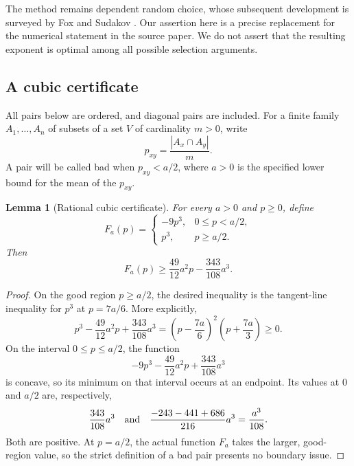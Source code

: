 \documentclass[11pt,letterpaper]{article}
\numberwithin{equation}{section}
\newtheorem{lemma}[theorem]{Lemma}
\theoremstyle{definition}
\theoremstyle{remark}
\newcommand{\1}{\mathbf 1}
\newcommand{\abs}[1]{\left|#1\right|}
\begin{document}
The method remains dependent random choice, whose subsequent development
is surveyed by Fox and Sudakov \cite{foxsudakov}.  Our assertion here
is a precise replacement for the numerical statement in the source paper.
We do not assert that the resulting exponent is optimal among all possible
selection arguments.

\subsection{A cubic certificate}

All pairs below are ordered, and diagonal pairs are included.  For a
finite family $A_1,\ldots,A_n$ of subsets of a set $V$ of cardinality $m>0$,
write
\[
 p_{xy}=\frac{\abs{A_x\cap A_y}}{m}.
\]
A pair will be called bad when $p_{xy}<a/2$, where $a>0$ is the specified
lower bound for the mean of the $p_{xy}$.

\begin{lemma}[Rational cubic certificate]\label{gsr:en:03:drc:cubic-certificate}
For every $a>0$ and $p\geq0$, define
\[
 F_a(p)=
 \begin{cases}
 -9p^3,&0\leq p<a/2,\\
 p^3,&p\geq a/2.
 \end{cases}
\]
Then
\begin{equation}\label{gsr:en:03:drc:certificate}
 F_a(p)\geq \frac{49}{12}a^2p-\frac{343}{108}a^3.
\end{equation}
\end{lemma}

\begin{proof}
On the good region $p\geq a/2$, the desired inequality is the tangent-line
inequality for $p^3$ at $p=7a/6$.  More explicitly,
\[
 p^3-\frac{49}{12}a^2p+\frac{343}{108}a^3
 =\left(p-\frac{7a}{6}\right)^2
   \left(p+\frac{7a}{3}\right)\geq0.
\]
On the interval $0\leq p\leq a/2$, the function
\[
 -9p^3-\frac{49}{12}a^2p+\frac{343}{108}a^3
\]
is concave, so its minimum on that interval occurs at an endpoint.  Its
values at $0$ and $a/2$ are, respectively,
\[
 \frac{343}{108}a^3
 \quad\hbox{and}\quad
 \frac{-243-441+686}{216}a^3=\frac{a^3}{108}.
\]
Both are positive.  At $p=a/2$, the actual function $F_a$ takes the larger,
good-region value, so the strict definition of a bad pair presents no
boundary issue.
\end{proof}
\end{document}
